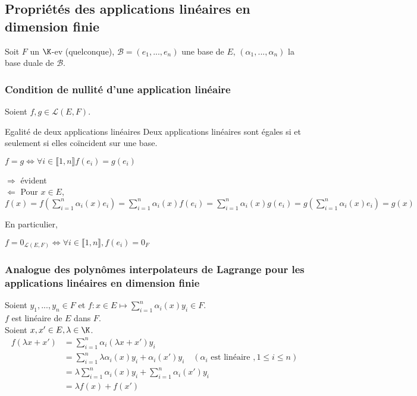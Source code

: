 \documentclass[12pt, a4paper]{report}
\begin{document}
\subsection{Propriétés des applications linéaires en dimension finie}

Soit $F$ un $\K$-ev (quelconque), $\mathcal{B} = (e_1,...,e_n)$ une base de $E$, $(\alpha_1,...,\alpha_n)$ la base duale de $\mathcal{B}$.

\subsubsection{Condition de nullité d'une application linéaire}

Soient $f,g \in \mathcal{L}(E,F)$.

\begin{theoreme}{Egalité de deux applications linéaires}{}
Deux applications linéaires sont égales si et seulement si elles coïncident sur une base.
\begin{center}
$f = g \Longleftrightarrow \forall i \in \llbracket 1,n \rrbracket f(e_i) = g(e_i)$
\end{center}
\end{theoreme}

\begin{demo}{}
$\Longrightarrow$ évident \\
$\Longleftarrow$ Pour $x \in E$, 
$f(x) = f\left(\displaystyle{\sum_{i=1}^n \alpha_i(x) e_i}\right) = \displaystyle{\sum_{i=1}^n \alpha_i(x) f(e_i) = \sum_{i=1}^n \alpha_i(x) g(e_i)} = g \left(\displaystyle{\sum_{i=1}^n \alpha_i(x) e_i} \right) = g(x)$
\end{demo}

En particulier,
\begin{center}
$f = 0_{\mathcal{L}(E,F)} \Longleftrightarrow \forall i \in \llbracket 1,n \rrbracket, f(e_i) = 0_F$
\end{center}

\subsubsection{Analogue des polynômes interpolateurs de Lagrange pour les applications linéaires en dimension finie}

Soient $y_1,...,y_n \in F$ et $f : x \in E \mapsto \displaystyle{\sum_{i=1}^n \alpha_i(x) y_i} \in F$. \\
$f$ est linéaire de $E$ dans $F$. \\
Soient $x,x' \in E, \lambda \in \K$. 
\begin{align*}
f(\lambda x+x') &= \sum_{i=1}^n \alpha_i(\lambda x + x')y_i \\
&= \sum_{i=1}^n \lambda \alpha_i(x)y_i+\alpha_i(x')y_i \quad (\alpha_i \text{ est linéaire }, 1 \le i \le n)\\
&= \lambda \sum_{i=1}^n \alpha_i(x)y_i + \sum_{i=1}^n \alpha_i(x')y_i \\
&= \lambda f(x) + f(x')
\end{align*}
\end{document}
